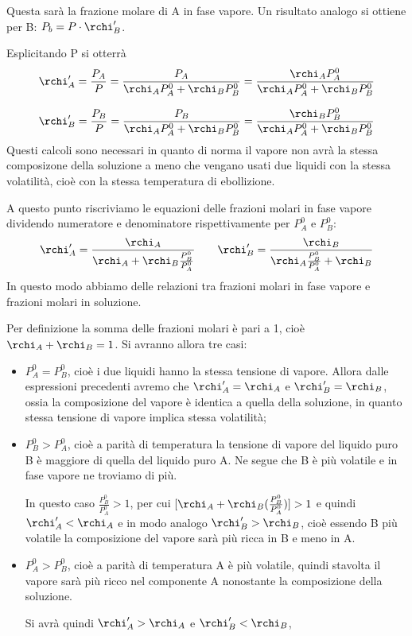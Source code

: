 Questa sarà la frazione molare di A in fase vapore. Un risultato analogo si ottiene per B: $P_b=P \cdot \rchi '_B$.

Esplicitando P si otterrà
$$\rchi '_A=\frac{P_A}{P}=
\frac{P_A}{\rchi_A P_A^0 + \rchi_B P_B^0}=
\frac{\rchi_A P_A^0}{\rchi_A P_A^0 + \rchi_B P_B^0}$$

$$\rchi '_B=\frac{P_B}{P}=
\frac{P_B}{\rchi_A P_A^0 + \rchi_B P_B^0}=
\frac{\rchi_B P_B^0}{\rchi_A P_A^0 + \rchi_B P_B^0}$$
Questi calcoli sono necessari in quanto di norma il vapore non avrà la stessa composizone della soluzione a meno che vengano usati due liquidi con la stessa volatilità, cioè con la stessa temperatura di ebollizione.

A questo punto riscriviamo le equazioni delle frazioni molari in fase vapore dividendo numeratore e denominatore rispettivamente per $P_A^0$ e $P_B^0$:
$$\rchi'_A=\frac{\rchi_A}{\rchi_A + \rchi_B\frac{P^0_B}{P^0_A}}
\qquad
\rchi'_B=\frac{\rchi_B}{\rchi_A\frac{P^0_B}{P^0_A} + \rchi_B}$$
In questo modo abbiamo delle relazioni tra frazioni molari in fase vapore e frazioni molari in soluzione.

Per definizione la somma delle frazioni molari è pari a 1, cioè $\rchi_A + \rchi_B =1$. Si avranno allora tre casi:
\begin{itemize}
    \item $P_A^0=P_B^0$, cioè i due liquidi hanno la stessa tensione di vapore. Allora dalle espressioni precedenti avremo che $\rchi_A'=\rchi_A$ e $\rchi_B'=\rchi_B$, ossia la composizione del vapore è identica a quella della soluzione, in quanto stessa tensione di vapore implica stessa volatilità;
    \item $P_B^0>P_A^0$, cioè a parità di temperatura la tensione di vapore del liquido puro B è maggiore di quella del liquido puro A. Ne segue che B è più volatile e in fase vapore ne troviamo di più.
    
    In questo caso $\frac{P_B^0}{P_A^0}>1$, per cui $[\rchi_A + \rchi_B(\frac{P_B^0}{P_A^0})]>1$ e quindi $\rchi_A' < \rchi_A$ e in modo analogo $\rchi_B' > \rchi_B$, cioè essendo B più volatile la composizione del vapore sarà più ricca in B e meno in A.
    \item  $P_A^0>P_B^0$, cioè a parità di temperatura A è più volatile, quindi stavolta il vapore sarà più ricco nel componente A nonostante la composizione della soluzione.
    
    Si avrà quindi $\rchi_A' > \rchi_A$ e $\rchi_B' < \rchi_B$,
\end{itemize}


